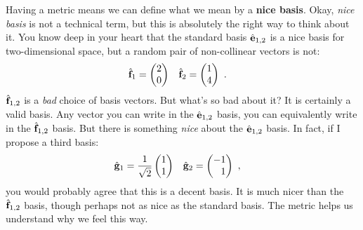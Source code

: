 \documentclass[12pt, oneside]{report}    %
\begin{document}
Having a metric means we can define what we mean by a \textbf{nice basis}. Okay, \emph{nice basis} is not a technical term, but this is absolutely the right way to think about it. You know deep in your heart that the standard basis $\hat{\mathbf{e}}_{1,2}$ is a nice basis for two-dimensional space, but a random pair of non-collinear vectors is not:
\begin{align}
    \hat{\mathbf{f}}_1 &=
    \begin{pmatrix}
        2\\0
    \end{pmatrix}
    &
    \hat{\mathbf{f}}_2 &=
    \begin{pmatrix}
        1\\4
    \end{pmatrix} \ .
\end{align}
$\hat{\mathbf{f}}_{1,2}$ is a \emph{bad} choice of basis vectors. But what's so bad about it? It is certainly a valid basis. Any vector you can write in the $\hat{\mathbf{e}}_{1,2}$ basis, you can equivalently write in the $\hat{\mathbf{f}}_{1,2}$ basis. But there is something \emph{nice} about the $\hat{\mathbf{e}}_{1,2}$ basis. In fact, if I propose a third basis:
\begin{align}
    \bas{g}_1 &=
    \frac{1}{\sqrt{2}}
    \begin{pmatrix}
        1\\1
    \end{pmatrix}
    &
    \bas{g}_2 &=
    \begin{pmatrix}
        -1\\\pp 1
    \end{pmatrix} \ ,
    \label{eq:rotated:R2:basis}
\end{align}
you would probably agree that this is a decent basis. It is much nicer than the $\hat{\mathbf{f}}_{1,2}$ basis, though perhaps not as nice as the standard basis. The metric helps us understand why we feel this way.
\end{document}
